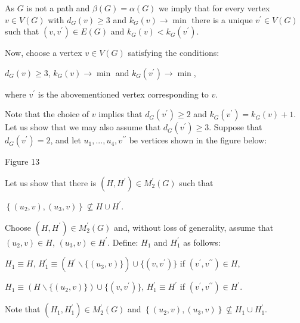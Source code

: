 \documentclass{article}
\begin{document}
As $G$ is not a path and $\beta (G)=\alpha (G)$ we imply that for every
vertex $v\in V(G)$ with $d_{G}(v)\geq 3$ and $k_{G}(v)\rightarrow \min $
there is a unique $v^{\prime }\in V(G)$ such that $(v,v^{\prime })\in E(G)$
and $k_{G}(v)<k_{G}(v^{\prime })$.

Now, choose a vertex $v\in V(G)$ satisfying the conditions:

\begin{center}
$d_{G}(v)\geq 3$, $k_{G}(v)\rightarrow \min $ and $k_{G}(v^{\prime
})\rightarrow \min $,
\end{center}

where $v^{\prime }$ is the abovementioned vertex corresponding to $v$.

Note that the choice of $v$ implies that $d_{G}(v^{\prime })\geq 2$ and $k_{G}(v^{\prime })=k_{G}(v)+1$. Let us show that we may also assume that $d_{G}(v^{\prime })\geq 3$. Suppose that $d_{G}(v^{\prime })=2$, and let $u_{1},...,u_{4},v^{\prime \prime }$ be vertices shown in the figure below:

\begin{center}

Figure 13\bigskip
\end{center}

Let us show that there is $(H,H^{\prime })\in M_{2}^{\prime }(G)$ such that

\begin{center}
$\left\{ (u_{2},v),(u_{3},v)\right\} \nsubseteq H\cup H^{\prime }$.
\end{center}

Choose $(H,H^{\prime })\in M_{2}^{\prime }(G)$ and, without loss of
generality, assume that $(u_{2},v)\in H$, $(u_{3},v)\in H^{\prime }$.
Define: $H_{1}$ and $H_{1}^{\prime }$ as follows:

\begin{center}
$H_{1}\equiv H$, $H_{1}^{\prime }\equiv (H^{\prime }\backslash
\{(u_{3},v)\})\cup \{(v,v^{\prime })\}$ if $(v^{\prime },v^{\prime \prime
})\in H$,

$H_{1}\equiv (H\backslash \{(u_{2},v)\})\cup \{(v,v^{\prime })\}$, $H_{1}^{\prime }\equiv H^{\prime }$ if $(v^{\prime },v^{\prime \prime })\in
H^{\prime }$.
\end{center}

Note that $(H_{1},H_{1}^{\prime })\in M_{2}^{\prime }(G)$ and $\left\{
(u_{2},v),(u_{3},v)\right\} \nsubseteq H_{1}\cup H_{1}^{\prime }$.
\end{document}
